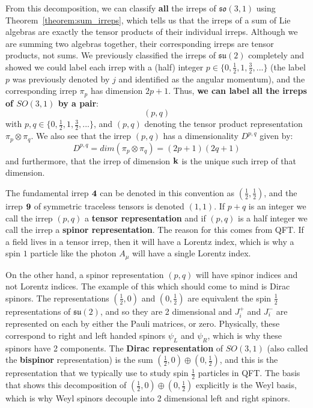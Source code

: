 \documentclass[11pt, oneside]{article}   	%
\theoremstyle{definition}
\begin{document}
From this decomposition, we can classify \textbf{all} the irreps of $\mathfrak{so}(3, 1)$ using 
Theorem~\ref{theorem:sum_irreps}, which tells us that the irreps of a sum of Lie algebras are exactly the tensor products 
of their individual irreps. Although we are summing two algebras together, their corresponding irreps are tensor products, not 
sums. We previously classified the irreps of $\mathfrak{su}(2)$ completely and showed we could label each irrep with a 
(half) integer $p\in\{0, \frac{1}{2}, 1, \frac{3}{2}, ...\}$ (the label $p$ was previously denoted by $j$ and identified as the 
angular momentum), and the corresponding irrep $\pi_p$ has dimension $2p + 1$. Thus, \textbf{we can label all the irreps 
of $SO(3, 1)$ by a pair}:
\begin{equation}
	(p, q)
\end{equation}
with $p, q\in\{0, \frac{1}{2}, 1, \frac{3}{2}, ...\}$, and $(p, q)$ denoting the tensor product representation $\pi_p\otimes\pi_q$. 
We also see that the irrep $(p, q)$ has a dimensionality $D^{p, q}$ given by:
\begin{equation}
	D^{p, q} = dim(\pi_p\otimes\pi_q) = (2p + 1)(2q + 1)
\end{equation}
and furthermore, that the irrep of dimension $\bf k$ is the unique such irrep of that dimension.

The fundamental irrep $\bf 4$ can be denoted in this convention as $(\frac{1}{2}, \frac{1}{2})$, and the irrep 
$\bf 9$ of symmetric traceless tensors is denoted $(1, 1)$. If $p + q$ is an integer we call the irrep $(p, q)$ a \textbf{tensor 
representation} and if $(p, q)$ is a half integer we call the irrep a \textbf{spinor representation}. The reason for this comes 
from QFT. If a field lives in a tensor irrep, then it will have a Lorentz index, which is why a spin $1$ particle like the photon 
$A_\mu$ will have a single Lorentz index. 

On the other hand, a spinor representation $(p, q)$ will have spinor indices and not Lorentz indices. The example of this 
which should come to mind is Dirac spinors. The representations $(\frac{1}{2}, 0)$ and $(0, \frac{1}{2})$ are equivalent 
the spin $\frac{1}{2}$ representations of $\mathfrak{su}(2)$, and so they are 2 dimensional and $J_i^+$ and $J_i^-$ 
are represented on each by either the Pauli matrices, or zero. Physically, these correspond to right and left handed 
spinors $\psi_L$ and $\psi_R$, which is why these spinors have 2 components. The \textbf{Dirac representation} 
of $SO(3, 1)$ (also called the \textbf{bispinor} representation) is the sum $(\frac{1}{2}, 0)\oplus (0, \frac{1}{2})$, 
and this is the representation that we typically use to study spin $\frac{1}{2}$ particles in QFT. The basis that shows 
this decomposition of $(\frac{1}{2}, 0)\oplus (0, \frac{1}{2})$ explicitly is the Weyl basis, which is why Weyl spinors 
decouple into 2 dimensional left and right spinors. 
\end{document}
